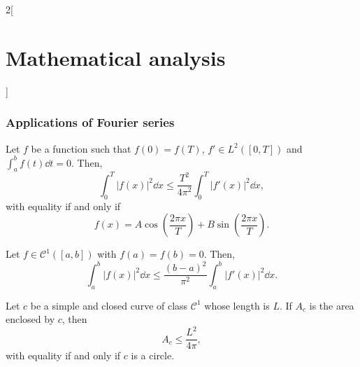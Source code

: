 \documentclass[../../../main.tex]{subfiles}
\begin{document}
\begin{multicols}{2}[\section{Mathematical analysis}]
\subsubsection*{Applications of Fourier series}
\begin{theorem}
Let $f$ be a function such that $f(0)=f(T)$, $f'\in L^2([0,T])$ and $\displaystyle\int_a^bf(t)\dd t=0$. Then, $$\int_0^T|f(x)|^2\dd x\leq\frac{T^2}{4\pi^2}\int_0^T|f'(x)|^2\dd x,$$ with equality if and only if $$f(x)=A\cos\left(\frac{2\pi x}{T}\right)+B\sin\left(\frac{2\pi x}{T}\right).$$
\end{theorem}
\begin{theorem}
Let $f\in \mathcal{C}^1([a,b])$ with $f(a)=f(b)=0$. Then, $$\int_a^b|f(x)|^2\dd x\leq\frac{(b-a)^2}{\pi^2}\int_a^b|f'(x)|^2\dd x.$$
\end{theorem}
\begin{theorem}
Let $c$ be a simple and closed curve of class $\mathcal{C}^1$ whose length is $L$. If $A_c$ is the area enclosed by $c$, then $$A_c\leq\frac{L^2}{4\pi},$$ with equality if and only if $c$ is a circle.
\end{theorem}
\end{multicols}
\end{document}

